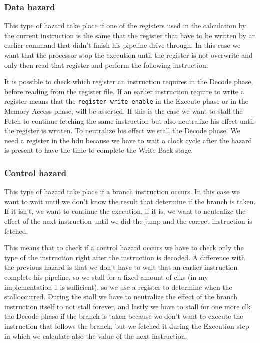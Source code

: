 \documentclass{article}
\begin{document}
\subsubsection{Data hazard}
This type of \gls{hazard} take place if one of the registers used in the calculation by the current instruction is the same that
the register that have to be written by an earlier command that didn't finish his pipeline drive-through. In this case we want that
the processor stop the execution until the register is not overwrite and only then read that register and perform the following instruction.

It is possible to check which register an instruction requires in the Decode phase, before reading from the register file.
If an earlier instruction require to write a register means that the \texttt{register write enable} in the Execute phase
or in the Memory Access phase, will be asserted. If this is the case we want to \gls{stall} the Fetch to continue fetching 
the same instruction but also neutralize his effect until the register is written. To neutralize his effect we \gls{stall} the
Decode phase. We need a register in the \acrshort{hdu} because we have to wait a clock cycle after the \gls{hazard} is present
to have the time to complete the Write Back stage.
\subsubsection{Control hazard}
This type of \gls{hazard} take place if a branch instruction occurs. In this case we want to wait until we don't know the \ALU
result that determine if the branch is taken. If it isn't, we want to continue the execution, if it is, we want to neutralize
the effect of the next instruction until we did the jump and the correct instruction is fetched.

This means that to check if a control \gls{hazard} occurs we have to check only the type of the instruction right after the instruction
is decoded. A difference with the previous hazard is that we don't have to wait that an earlier instruction complete his pipeline, so we
\gls{stall} for a fixed amount of \glspl{clk} (in my implementation 1 is sufficient), so we use a register to determine when the \gls{stall}occurred.
During the \gls{stall} we have to neutralize the effect of the branch instruction itself to not \gls{stall} forever, and lastly we have to 
\gls{stall} for one more \gls{clk} the Decode phase if the branch is taken because we don't want to execute the instruction that follows the branch,
but we fetched it during the Execution step in which we calculate also the value of the next instruction.
\end{document}

